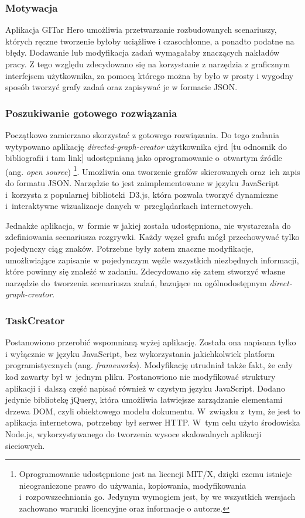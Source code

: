 \documentclass[11pt,a4paper,polish,thesis]{dcsbook}
\begin{document}
	\subsubsection{Motywacja}
	
	Aplikacja GITar Hero umożliwia przetwarzanie rozbudowanych scenariuszy, których ręczne tworzenie byłoby uciążliwe i  czasochłonne, a ponadto podatne na błędy. Dodawanie lub modyfikacja zadań wymagałaby znaczących nakładów pracy.
	Z tego względu zdecydowano się na korzystanie z narzędzia z graficznym interfejsem użytkownika, za pomocą którego można by było w prosty i wygodny sposób tworzyć grafy zadań oraz zapisywać je w formacie JSON. 
	
	\subsubsection{Poszukiwanie gotowego rozwiązania}
	
	Początkowo zamierzano skorzystać z gotowego rozwiązania. Do tego zadania wytypowano aplikację \textit{directed-graph-creator} użytkownika cjrd [tu odnosnik do bibliografii i tam link] udostępnianą jako oprogramowanie o~otwartym źródle (ang. \textit{open source}) \footnote{Oprogramowanie udostępnione jest na licencji MIT/X, dzięki czemu istnieje nieograniczone prawo do używania, kopiowania, modyfikowania i~rozpowszechniania go. Jedynym wymogiem jest, by we wszystkich wersjach zachowano warunki licencyjne oraz informacje o autorze.}. Umożliwia ona tworzenie grafów skierowanych oraz~ich zapis do formatu JSON. Narzędzie to jest zaimplementowane w języku JavaScript i~korzysta z popularnej biblioteki~D3.js, która pozwala tworzyć dynamiczne i~interaktywne wizualizacje danych w~przeglądarkach internetowych.
	
	Jednakże aplikacja, w~formie w jakiej została udostępniona, nie wystarczała do zdefiniowania scenariusza rozgrywki. Każdy węzeł grafu mógł przechowywać tylko pojedynczy ciąg znaków. Potrzebne były zatem znaczne modyfikacje, umożliwiające zapisanie w pojedynczym węźle wszystkich niezbędnych informacji, które powinny się znaleźć w zadaniu. Zdecydowano się zatem stworzyć własne narzędzie do~tworzenia scenariusza zadań, bazujące na ogólnodostępnym \textit{direct-graph-creator}.
	
	\subsubsection{TaskCreator}
	
	Postanowiono przerobić wspomnianą wyżej aplikację. Została ona napisana tylko i wyłącznie w języku JavaScript, bez wykorzystania jakichkolwiek platform programistycznych (ang. \textit{frameworks}). Modyfikację utrudniał także fakt, że cały kod zawarty był w~jednym pliku. Postanowiono nie modyfikować struktury aplikacji i~dalszą część napisać również w czystym języku JavaScript. Dodano jedynie bibliotekę jQuery, która umożliwia łatwiejsze zarządzanie elementami drzewa DOM, czyli obiektowego modelu dokumentu. W~związku z~tym, że jest to aplikacja internetowa, potrzebny był serwer HTTP. W~tym celu użyto środowiska Node.js, wykorzystywanego do tworzenia wysoce skalowalnych aplikacji sieciowych.
		
\end{document}
